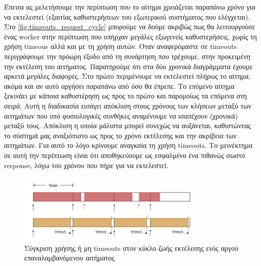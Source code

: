 Έπειτα ας μελετήσουμε την περίπτωση που το αίτημα χρειάζεται παραπάνω χρόνο για να εκτελεστεί (εξαιτίας καθυστερήσεων του εξωτερικού συστήματος που ελέγχεται).
Στο \autoref{fig:timeouts_request_cycle} μπορούμε να δούμε ακριβώς πως θα λειτουργούσε ένας worker στην περίπτωση που υπήρχαν μεγάλες εξωγενείς καθυστερήσεις, χωρίς τη χρήση
timeous αλλά και με τη χρήση αυτών. Όταν αναφερόμαστε σε timeouts περιγράφουμε την πρόωρη έξοδο από τη συνάρτηση που τρέχουμε, στην
προκειμένη την εκτέλεση του αιτήματος. Παρατηρούμε ότι στα δύο χρονικά διαγράμματα έχουμε αρκετά μεγάλες διαφορές.
Στο πρώτο περιμένουμε να εκτελεστεί πλήρως το αίτημα, ακόμα και αν αυτό αργήσει παραπάνω από όσο
θα έπρεπε. Το επόμενο αίτημα ξεκινάει με κάποια καθυστέρηση ως προς το πρώτο και παρομοίως τα επόμενα στη σειρά.
Αυτή η διαδικασία εισάγει απόκλιση στους χρόνους των κλήσεων μεταξύ των αιτημάτων που υπό φυσιολογικές συνθήκες αναμένουμε να ισαπέχουν (χρονικά) μεταξύ τους.
Απόκλιση η οποία μάλιστα μπορεί συνεχώς να αυξάνεται, καθιστώντας το σύστημά μας αναξιόπιστο ως προς
το χρόνο εκτέλεσης και την ακρίβεια των αιτημάτων. Για αυτό το λόγο κρίνουμε αναγκαία τη χρήση timeouts.
Το μεινέκτημα σε αυτή την περίπτωση είναι ότι αποθηκεύουμε ως εσφαλμένο ένα πιθανώς σωστό response, λόγω του χρόνου που πήρε για να εκτελεστεί.

\begin{figure}[!ht]
	\centering
	\includegraphics[width=0.8\textwidth]{./images/chapter4/timeout_request_cycle.png}
	\caption[Σύγκριση χρήσης ή μη timeouts στον κύκλο ζωής εκτέλεσης ενός αργού επαναλαμβανόμενου αιτήματος]{Σύγκριση χρήσης ή μη timeouts στον κύκλο ζωής εκτέλεσης ενός αργού επαναλαμβανόμενου αιτήματος}
	\label{fig:timeouts_request_cycle}
\end{figure}

